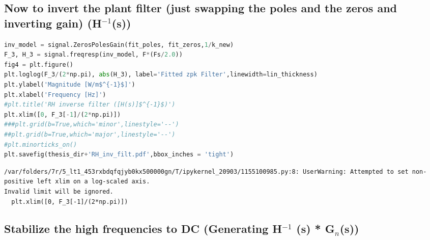 \hypertarget{now-to-invert-the-plant-filter-just-swapping-the-poles-and-the-zeros-and-inverting-gain-h-1s}{%
\subsection{\texorpdfstring{Now to invert the plant filter (just
swapping the poles and the zeros and inverting gain)
(H\(^{-1}\)(s))}{Now to invert the plant filter (just swapping the poles and the zeros and inverting gain) (H\^{}\{-1\}(s))}}\label{now-to-invert-the-plant-filter-just-swapping-the-poles-and-the-zeros-and-inverting-gain-h-1s}}

\begin{spacing}{1} \begin{lstlisting}[language=Python]
inv_model = signal.ZerosPolesGain(fit_poles, fit_zeros,1/k_new)
F_3, H_3 = signal.freqresp(inv_model, F*(Fs/2.0))
fig4 = plt.figure()
plt.loglog(F_3/(2*np.pi), abs(H_3), label='Fitted zpk Filter',linewidth=lin_thickness)
plt.ylabel('Magnitude [W/m$^{-1}$]')
plt.xlabel('Frequency [Hz]')
#plt.title('RH inverse filter ([H(s)]$^{-1}$)')
plt.xlim([0, F_3[-1]/(2*np.pi)])
###plt.grid(b=True,which='minor',linestyle='--')
##plt.grid(b=True,which='major',linestyle='--')
#plt.minorticks_on()
plt.savefig(thesis_dir+'RH_inv_filt.pdf',bbox_inches = 'tight')
\end{lstlisting} \end{spacing}

\begin{spacing}{1} \begin{lstlisting}
/var/folders/7r/5_lt1_453rxbdqfqjyb0kx500000gn/T/ipykernel_20903/1155100985.py:8: UserWarning: Attempted to set non-positive left xlim on a log-scaled axis.
Invalid limit will be ignored.
  plt.xlim([0, F_3[-1]/(2*np.pi)])
\end{lstlisting} \end{spacing}


\hypertarget{stabilize-the-high-frequencies-to-dc-generating-h-1-s-g_ns}{%
\subsection{\texorpdfstring{Stabilize the high frequencies to DC
(Generating H\(^{-1}\) (s) *
G\(_{n}\)(s))}{Stabilize the high frequencies to DC (Generating H\^{}\{-1\} (s) * G\_\{n\}(s))}}\label{stabilize-the-high-frequencies-to-dc-generating-h-1-s-g_ns}}

